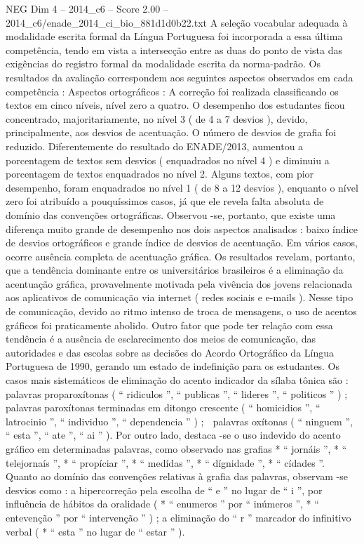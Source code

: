 \begin{textsample}{NEG Dim 4 – 2014\_c6 – Score 2.00 – 2014\_c6/enade\_2014\_ci\_bio\_881d1d0b22.txt}
A seleção vocabular adequada à modalidade escrita formal da Língua Portuguesa foi incorporada a essa última competência, tendo em vista a intersecção entre as duas do ponto de vista das exigências do registro formal da modalidade escrita da norma-padrão.
Os resultados da avaliação correspondem aos seguintes aspectos observados em cada competência : Aspectos ortográficos : A correção foi realizada classificando os textos em cinco níveis, nível zero a quatro.
O desempenho dos estudantes ficou concentrado, majoritariamente, no nível 3 ( de 4 a 7 desvios ), devido, principalmente, aos desvios de acentuação.
O número de desvios de grafia foi reduzido.
Diferentemente do resultado do ENADE/2013, aumentou a porcentagem de textos sem desvios ( enquadrados no nível 4 ) e diminuiu a porcentagem de textos enquadrados no nível 2.
Alguns textos, com pior desempenho, foram enquadrados no nível 1 ( de 8 a 12 desvios ), enquanto o nível zero foi atribuído a pouquíssimos casos, já que ele revela falta absoluta de domínio das convenções ortográficas.
Observou -se, portanto, que existe uma diferença muito grande de desempenho nos dois aspectos analisados : baixo índice de desvios ortográficos e grande índice de desvios de acentuação.
Em vários casos, ocorre ausência completa de acentuação gráfica.
Os resultados revelam, portanto, que a tendência dominante entre os universitários brasileiros é a eliminação da acentuação gráfica, provavelmente motivada pela vivência dos jovens relacionada aos aplicativos de comunicação via internet ( redes sociais e e-mails ).
Nesse tipo de comunicação, devido ao ritmo intenso de troca de mensagens, o uso de acentos gráficos foi praticamente abolido.
Outro fator que pode ter relação com essa tendência é a ausência de esclarecimento dos meios de comunicação, das autoridades e das escolas sobre as decisões do Acordo Ortográfico da Língua Portuguesa de 1990, gerando um estado de indefinição para os estudantes.
Os casos mais sistemáticos de eliminação do acento indicador da sílaba tônica são :  palavras proparoxítonas ( “ ridiculos ”, “ publicas ”, “ lideres ”, “ politicos ” ) ;  palavras paroxítonas terminadas em ditongo crescente ( “ homicidios ”, “ latrocinio ”, “ individuo ”, “ dependencia ” ) ;  palavras oxítonas ( “ ninguem ”, “ esta ”, “ ate ”, “ ai ” ).
Por outro lado, destaca -se o uso indevido do acento gráfico em determinadas palavras, como observado nas grafias * “ jornáis ”, * “ telejornaís ”, * “ propíciar ”, * “ medídas ”, * “ dígnidade ”, * “ cídades ”.
Quanto ao domínio das convenções relativas à grafia das palavras, observam -se desvios como : a hipercorreção pela escolha de “ e ” no lugar de “ i ”, por influência de hábitos da oralidade ( * “ enumeros ” por “ inúmeros ”, * “ entevenção ” por “ intervenção ” ) ; a eliminação do “ r ” marcador do infinitivo verbal ( * “ esta ” no lugar de “ estar ” ).

\end{textsample}
